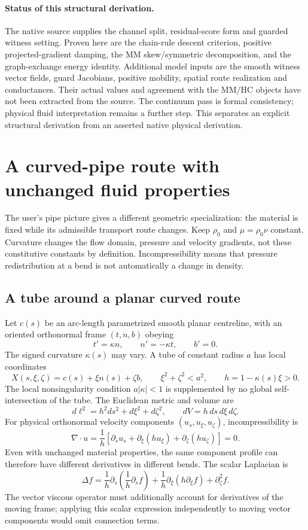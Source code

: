 \documentclass[11pt,a4paper]{article}
\begin{document}
\paragraph{Status of this structural derivation.}
The native source supplies the channel split, residual-score form and
guarded witness setting. Proven here are the chain-rule descent criterion,
positive projected-gradient damping, the MM skew/symmetric decomposition,
and the graph-exchange energy identity. Additional model inputs are the
smooth witness vector fields, guard Jacobians, positive mobility, spatial
route realization and conductances. Their actual values and agreement with
the MM/HC objects have not been extracted from the source. The continuum
pass is formal consistency; physical fluid interpretation remains a further
step. This separates an explicit structural derivation from an asserted
native physical derivation.

\section{A curved-pipe route with unchanged fluid properties}
\label{sec:curved-route}
The user's pipe picture gives a different geometric specialization: the
material is fixed while its admissible transport route changes. Keep
$\rho_0$ and $\mu=\rho_0\nu$ constant. Curvature changes the flow domain,
pressure and velocity gradients, not these constitutive constants by definition.
Incompressibility means that pressure redistribution at a bend is not
automatically a change in density.

\subsection{A tube around a planar curved route}
Let $c(s)$ be an arc-length parametrized smooth planar centreline, with
an oriented orthonormal frame $(t,n,b)$ obeying
\[
t'=\kappa n,\qquad n'=-\kappa t,\qquad b'=0.
\]
The signed curvature $\kappa(s)$ may vary. A tube of constant radius $a$
has local coordinates
\[
X(s,\xi,\zeta)=c(s)+\xi n(s)+\zeta b,
\qquad \xi^2+\zeta^2<a^2,
\qquad h=1-\kappa(s)\xi>0.
\]
The local nonsingularity condition $a|\kappa|<1$ is supplemented by no
global self-intersection of the tube. The Euclidean metric and volume are
\[
d\ell^2=h^2ds^2+d\xi^2+d\zeta^2,
\qquad dV=h\,ds\,d\xi\,d\zeta.
\]
For physical orthonormal velocity components $(u_s,u_\xi,u_\zeta)$,
incompressibility is
\[
\nabla\cdot u=\frac1h
\left[\partial_su_s+\partial_\xi(hu_\xi)
+\partial_\zeta(hu_\zeta)\right]=0.
\]
Even with unchanged material properties, the same component profile can
therefore have different derivatives in different bends. The scalar
Laplacian is
\[
\Delta f=\frac1h\partial_s\left(\frac1h\partial_sf\right)
+\frac1h\partial_\xi(h\partial_\xi f)+\partial_\zeta^2f.
\]
The vector viscous operator must additionally account for derivatives of
the moving frame; applying this scalar expression independently to moving
vector components would omit connection terms.
\end{document}
